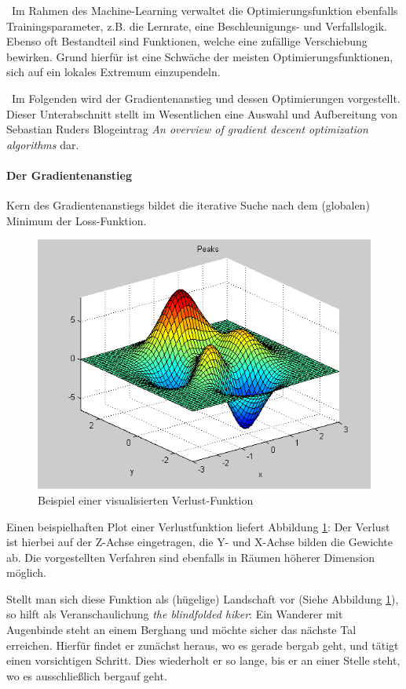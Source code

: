 ~\newline Im Rahmen des Machine-Learning verwaltet die Optimierungsfunktion ebenfalls Trainingsparameter, z.B. die Lernrate, eine Beschleunigungs- und Verfallslogik. Ebenso oft Bestandteil sind Funktionen, welche eine zufällige Verschiebung bewirken. Grund hierfür ist eine Schwäche der meisten Optimierungsfunktionen, sich auf ein lokales Extremum einzupendeln.

~\newline Im Folgenden wird der Gradientenanstieg und dessen Optimierungen vorgestellt. Dieser Unterabschnitt stellt im Wesentlichen eine Auswahl und Aufbereitung von Sebastian Ruders Blogeintrag \textit{An overview of gradient descent optimization algorithms} \cite{OptimizationFunction} dar.
\paragraph{Der Gradientenanstieg} Kern des Gradientenanstiegs bildet die iterative Suche nach dem (globalen) Minimum der Loss-Funktion. 
\begin{figure}[h]
	\begin{center}
		\includegraphics[width=0.6\linewidth]{Bilder/optimization}
		\caption[Loss-Function:\newline \tiny \url{
			http://www.ahozer.com/research.html}\normalsize]{Beispiel einer visualisierten Verlust-Funktion}
		\label{fig:Loss}
	\end{center}
\end{figure}
Einen beispielhaften Plot einer Verlustfunktion liefert Abbildung \ref{fig:Loss}: Der Verlust ist hierbei auf der Z-Achse eingetragen, die Y- und X-Achse bilden die Gewichte ab. Die vorgestellten Verfahren sind ebenfalls in Räumen höherer Dimension möglich.

Stellt man sich diese Funktion als (hügelige) Landschaft vor (Siehe Abbildung \ref{fig:Loss}), so hilft als Veranschaulichung \textit{the blindfolded hiker}: Ein Wanderer mit Augenbinde steht an einem Berghang und möchte sicher das nächste Tal erreichen. Hierfür findet er zunächst heraus, wo es gerade bergab geht, und tätigt einen vorsichtigen Schritt. Dies wiederholt er so lange, bis er an einer Stelle steht, wo es ausschließlich bergauf geht.

